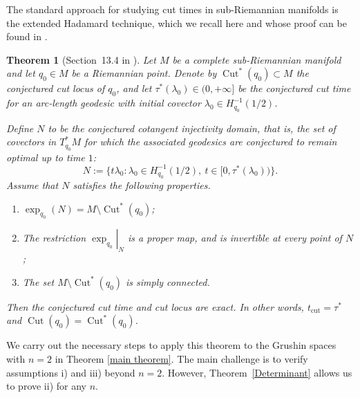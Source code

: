 \documentclass[12pt]{amsart}
\newcommand{\samuel}[1]{{\color{teal} Samuel says: #1}}
\numberwithin{equation}{section}
\theoremstyle{plain}
\newtheorem{theorem}{Theorem}[section]
\theoremstyle{definition}
\theoremstyle{remark}
\begin{document}

The standard approach for studying cut times in sub-Riemannian manifolds is the extended Hadamard technique, which we recall here and whose proof can be found in \cite[Chapter 13]{AgrachevBarilariBoscainBook2020}.
\begin{theorem}[Section~13.4 in \cite{AgrachevBarilariBoscainBook2020}]\label{Extended Hadamard Technique} Let $M$ be a complete sub-Riemannian manifold and let $q_0\in M$ be a Riemannian point. Denote by $\operatorname{Cut}^{\ast}(q_0) \subset M$ the conjectured cut locus of $q_0$, and let $\tau^{\ast}(\lambda_0) \in (0, +\infty]$ be the conjectured cut time for an arc-length geodesic with initial covector $\lambda_0 \in H^{-1}_{q_0}(1/2)$.

    Define $N$ to be the conjectured cotangent injectivity domain, that is, the set of covectors in $T^{\ast}_{q_0}M$ for which the associated geodesics are conjectured to remain optimal up to time $1$:
    \[
        N := \{t\lambda_0 : \lambda_0 \in H^{-1}_{q_0}(1/2),\ t \in [0, \tau^{\ast}(\lambda_0))\}.
    \]
    Assume that $N$ satisfies the following properties.
    \begin{enumerate}[label=\normalfont\roman*), itemsep=4pt]
        \item $\exp_{q_0}(N) = M \setminus \operatorname{Cut}^{\ast}(q_0)$;
        \item The restriction $\left.\exp_{q_0}\right|_N$ is a proper map, and is invertible at every point of $N$;
        \item The set $M \setminus \operatorname{Cut}^\ast(q_0)$ is simply connected.
    \end{enumerate}
    Then the conjectured cut time and cut locus are exact. In other words, $t_{\operatorname{cut}} = \tau^{\ast}$ and $\operatorname{Cut}(q_0) = \operatorname{Cut}^{\ast}(q_0)$.
\end{theorem}
We carry out the necessary steps to apply this theorem to the Grushin spaces with $n=2$ in Theorem \ref{main theorem}. The main challenge is to verify assumptions i) and iii) beyond $n=2$. However, Theorem~\ref{Determinant} allows us to prove ii) for any $n$.
\end{document}
